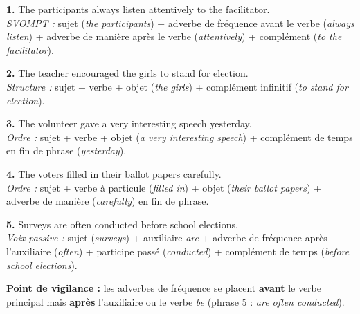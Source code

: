 \documentclass[11pt]{article}
\begin{document}
\begin{corrige}

\textbf{1.} The participants always listen attentively to the facilitator.\\
\emph{SVOMPT :} sujet (\emph{the participants}) + adverbe de fréquence avant le verbe (\emph{always listen}) + adverbe de manière après le verbe (\emph{attentively}) + complément (\emph{to the facilitator}).

\textbf{2.} The teacher encouraged the girls to stand for election.\\
\emph{Structure :} sujet + verbe + objet (\emph{the girls}) + complément infinitif (\emph{to stand for election}).

\textbf{3.} The volunteer gave a very interesting speech yesterday.\\
\emph{Ordre :} sujet + verbe + objet (\emph{a very interesting speech}) + complément de temps en fin de phrase (\emph{yesterday}).

\textbf{4.} The voters filled in their ballot papers carefully.\\
\emph{Ordre :} sujet + verbe à particule (\emph{filled in}) + objet (\emph{their ballot papers}) + adverbe de manière (\emph{carefully}) en fin de phrase.

\textbf{5.} Surveys are often conducted before school elections.\\
\emph{Voix passive :} sujet (\emph{surveys}) + auxiliaire \emph{are} + adverbe de fréquence après l'auxiliaire (\emph{often}) + participe passé (\emph{conducted}) + complément de temps (\emph{before school elections}).

\textbf{Point de vigilance :} les adverbes de fréquence se placent \textbf{avant} le verbe principal mais \textbf{après} l'auxiliaire ou le verbe \emph{be} (phrase 5 : \emph{are often conducted}).
\end{corrige}
\end{document}
